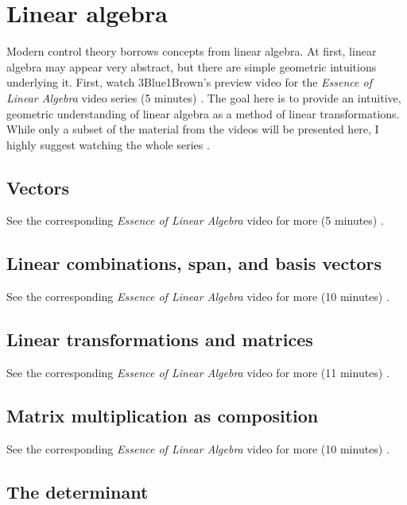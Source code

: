 \section{Linear algebra}

Modern control theory borrows concepts from linear algebra. At first, linear
algebra may appear very abstract, but there are simple geometric intuitions
underlying it. First, watch 3Blue1Brown's preview video for the
\textit{Essence of Linear Algebra} video series (5 minutes)
\cite{bib:linalg_preview}. The goal here is to provide an intuitive, geometric
understanding of linear algebra as a method of linear transformations. \\

While only a subset of the material from the videos will be presented here, I
highly suggest watching the whole series \cite{bib:essence_of_linalg}.

\subsection{Vectors}

See the corresponding \textit{Essence of Linear Algebra} video for more (5
minutes) \cite{bib:linalg_vectors}.

\subsection{Linear combinations, span, and basis vectors}

See the corresponding \textit{Essence of Linear Algebra} video for more (10
minutes) \cite{bib:linalg_linear_combinations}.

\subsection{Linear transformations and matrices}

See the corresponding \textit{Essence of Linear Algebra} video for more (11
minutes) \cite{bib:linalg_linear_transformations_and_matrices}.

\subsection{Matrix multiplication as composition}

See the corresponding \textit{Essence of Linear Algebra} video for more (10
minutes) \cite{bib:linalg_matrix_multiplication_as_composition}.

\subsection{The determinant}


